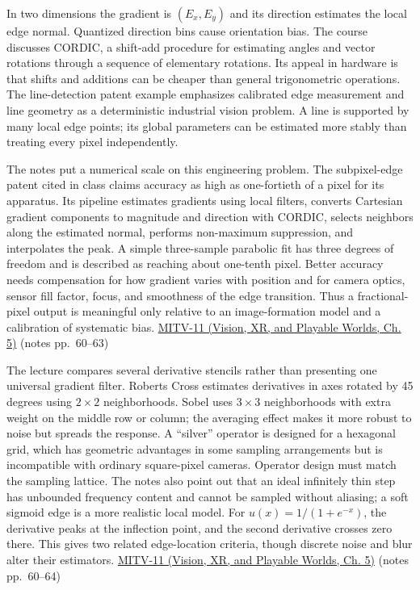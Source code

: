 In two dimensions the gradient is \((E_x,E_y)\) and its direction estimates the local edge normal. Quantized direction bins cause orientation bias. The course discusses CORDIC, a shift-add procedure for estimating angles and vector rotations through a sequence of elementary rotations. Its appeal in hardware is that shifts and additions can be cheaper than general trigonometric operations. The line-detection patent example emphasizes calibrated edge measurement and line geometry as a deterministic industrial vision problem. A line is supported by many local edge points; its global parameters can be estimated more stably than treating every pixel independently.

The notes put a numerical scale on this engineering problem. The subpixel-edge patent cited in class claims accuracy as high as one-fortieth of a pixel for its apparatus. Its pipeline estimates gradients using local filters, converts Cartesian gradient components to magnitude and direction with CORDIC, selects neighbors along the estimated normal, performs non-maximum suppression, and interpolates the peak. A simple three-sample parabolic fit has three degrees of freedom and is described as reaching about one-tenth pixel. Better accuracy needs compensation for how gradient varies with position and for camera optics, sensor fill factor, focus, and smoothness of the edge transition. Thus a fractional-pixel output is meaningful only relative to an image-formation model and a calibration of systematic bias. \href{../07-Vision-XR-and-Playable-Worlds/main.pdf\#nameddest=04-visual-computing-ii-ch036-mitv-11---edge-detection-subpixel-position-cordic-line-detection-us-6408109}{MITV-11 (Vision, XR, and Playable Worlds, Ch. 5)} (notes pp.~60--63)

The lecture compares several derivative stencils rather than presenting one universal gradient filter. Roberts Cross estimates derivatives in axes rotated by 45 degrees using \(2\times2\) neighborhoods. Sobel uses \(3\times3\) neighborhoods with extra weight on the middle row or column; the averaging effect makes it more robust to noise but spreads the response. A ``silver'' operator is designed for a hexagonal grid, which has geometric advantages in some sampling arrangements but is incompatible with ordinary square-pixel cameras. Operator design must match the sampling lattice. The notes also point out that an ideal infinitely thin step has unbounded frequency content and cannot be sampled without aliasing; a soft sigmoid edge is a more realistic local model. For \(u(x)=1/(1+e^{-x})\), the derivative peaks at the inflection point, and the second derivative crosses zero there. This gives two related edge-location criteria, though discrete noise and blur alter their estimators. \href{../07-Vision-XR-and-Playable-Worlds/main.pdf\#nameddest=04-visual-computing-ii-ch036-mitv-11---edge-detection-subpixel-position-cordic-line-detection-us-6408109}{MITV-11 (Vision, XR, and Playable Worlds, Ch. 5)} (notes pp.~60--64)

